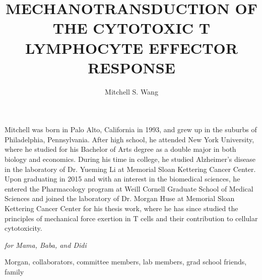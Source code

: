 \documentclass[phd,tocprelim]{cornell}
\title{MECHANOTRANSDUCTION OF THE CYTOTOXIC T LYMPHOCYTE  EFFECTOR RESPONSE}
\author {Mitchell S. Wang}
\begin{document}
\maketitle
\makecopyright

\begin{abstract}

\end{abstract}

\begin{biosketch}
Mitchell was born in Palo Alto, California in 1993, and grew up in the suburbs of Philadelphia, Pennsylvania. After high school, he attended New York University, where he studied for his Bachelor of Arts degree as a double major in both biology and economics. During his time in college, he studied Alzheimer’s disease in the laboratory of Dr. Yueming Li at Memorial Sloan Kettering Cancer Center. Upon graduating in 2015 and with an interest in the biomedical sciences, he entered the Pharmacology program at Weill Cornell Graduate School of Medical Sciences and joined the laboratory of Dr. Morgan Huse at Memorial Sloan Kettering Cancer Center for his thesis work, where he has since studied the principles of mechanical force exertion in T cells and their contribution to cellular cytotoxicity.
\end{biosketch}

\begin{dedication}
\emph{for Mama, Baba, and Didi}
\end{dedication}

\begin{acknowledgements}
Morgan, collaborators, committee members, lab members, grad school friends, family
\end{acknowledgements}

\contentspage
\tablelistpage
\figurelistpage

\normalspacing \setcounter{page}{1} 
\pagestyle{cornell} \addtolength{\parskip}{0.5\baselineskip}

\end{document}
